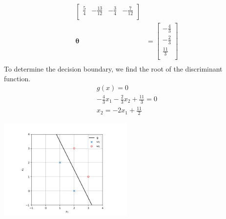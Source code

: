 \documentclass[a4paper, 10pt, twoside]{article}
\begin{document}
\begin{enumerate}[a)]
\begin{align*}
\begin{bmatrix}
                  \frac{5}{4}  & -\frac{13}{12} & -\frac{3}{4} & -\frac{7}{12} \\
              \end{bmatrix} \\
              \bm{\theta}    & =
              \begin{bmatrix}
                  -\frac{4}{3} \\
                  -\frac{2}{3} \\
                  \frac{11}{3} \\
              \end{bmatrix} \\
          \end{align*}
          To determine the decision boundary, we find the root of the discriminant function.
          \begin{align*}
              g(x) = 0                                              \\
              -\frac{4}{3} x_1 - \frac{2}{3} x_2 + \frac{11}{3} = 0 \\
              x_2 = -2x_1 + \frac{11}{2}
          \end{align*}
          \begin{center}
              \includegraphics[width=0.5\textwidth]{img/graph2.png}
          \end{center}


\end{enumerate}
\end{document}
